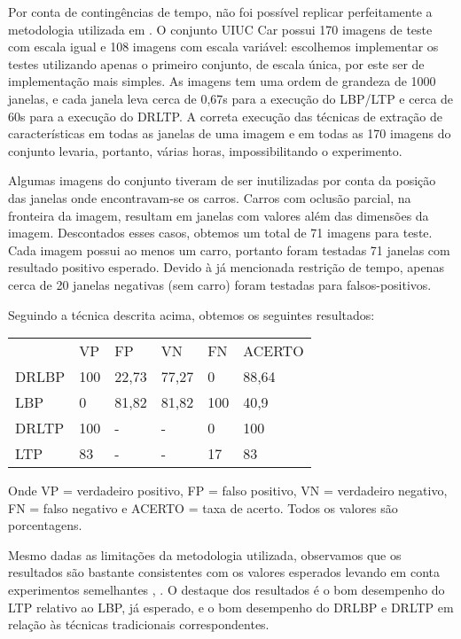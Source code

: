 \documentclass[a4paper,twocolumn]{article}
\begin{document}
Por conta de contingências de tempo, não foi possível replicar perfeitamente a metodologia utilizada em \cite{satpathy}. O conjunto UIUC Car possui 170 imagens de teste com escala igual e 108 imagens com escala variável: escolhemos implementar os testes utilizando apenas o primeiro conjunto, de escala única, por este ser de implementação mais simples. As imagens tem uma ordem de grandeza de 1000 janelas, e cada janela leva cerca de 0,67s para a execução do LBP/LTP e cerca de 60s para a execução do DRLTP. A correta execução das técnicas de extração de características em todas as janelas de uma imagem e em todas as 170 imagens do conjunto levaria, portanto, várias horas, impossibilitando o experimento.

Algumas imagens do conjunto tiveram de ser inutilizadas por conta da posição das janelas onde encontravam-se os carros. Carros com oclusão parcial, na fronteira da imagem, resultam em janelas com valores além das dimensões da imagem. Descontados esses casos, obtemos um total de 71 imagens para teste. Cada imagem possui ao menos um carro, portanto foram testadas 71 janelas com resultado positivo esperado. Devido à já mencionada restrição de tempo, apenas cerca de 20 janelas negativas (sem carro) foram testadas para falsos-positivos.

Seguindo a técnica descrita acima, obtemos os seguintes resultados:

\begin{table}[h]
      \begin{tabular}{llllll}
            & VP  & FP    & VN    & FN  & ACERTO \\
      DRLBP & 100 & 22,73 & 77,27 & 0   & 88,64  \\
      LBP   & 0   & 81,82 & 81,82 & 100 & 40,9   \\
      DRLTP & 100 & -     & -     & 0   & 100    \\
      LTP   & 83  & -     & -     & 17  & 83    
      \end{tabular}
\end{table}

Onde VP = verdadeiro positivo, FP = falso positivo, VN = verdadeiro negativo, FN = falso negativo e ACERTO = taxa de acerto. Todos os valores são porcentagens.

Mesmo dadas as limitações da metodologia utilizada, observamos que os resultados são bastante consistentes com os valores esperados levando em conta experimentos semelhantes \cite{satpathy}, \cite{khoo}. O destaque dos resultados é o bom desempenho do LTP relativo ao LBP, já esperado\cite{khoo}, e o bom desempenho do DRLBP e DRLTP em relação às técnicas tradicionais correspondentes.
\end{document}
